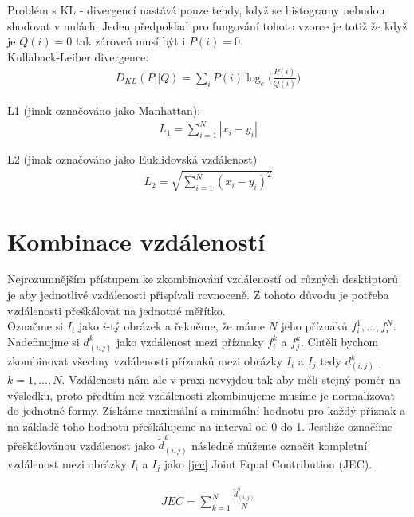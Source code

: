 \documentclass[czech,BP]{thesiskiv}
\begin{document}
Problém s KL - divergencí nastává pouze tehdy, když se histogramy nebudou shodovat v nulách. Jeden předpoklad pro fungování tohoto vzorce je totiž že když je $Q(i) = 0$ tak zároveň musí být i $P(i) = 0$. \\

Kullaback-Leiber divergence:
\begin{align}
   \label{kl}  D_{KL} (P || Q) = \sum_{i} P(i) \log_e \bigg({\frac{P(i)}{Q(i)}} \bigg) 
\end{align}

L1 (jinak označováno jako Manhattan):
\begin{align}
   \label{L1} L_1 = \sum_{i=1}^{N} |x_i - y_i|  
\end{align}

L2 (jinak označováno jako Euklidovská vzdálenost)
\begin{align}
   \label{L2} L_2 = \sqrt{\sum_{i=1}^{N} (x_i - y_i)^2}  
\end{align}
 
\section{Kombinace vzdáleností}
Nejrozumnějším přístupem ke zkombinování vzdáleností od různých desktiptorů je aby jednotlivé vzdálenosti přispívali rovnoceně. Z tohoto důvodu je potřeba vzdálenosti přeškálovat na jednotné měřítko.\\
Označme si $I_i$ jako $i$-tý obrázek a řekněme, že máme $N$ jeho příznaků $f_i^1, ..., f_i^N$. Nadefinujme si $d_{(i,j)}^k$ jako vzdálenost mezi příznaky $f_i^k$ a $f_j^k$. Chtěli bychom zkombinovat všechny vzdálenosti příznaků mezi obrázky $I_i$ a $I_j$ tedy $d_{(i,j)}^k$ , $k=1, ..., N$.  Vzdálenosti nám ale v praxi nevyjdou tak aby měli stejný poměr na výsledku, proto předtím než vzdálenosti zkombinujeme musíme je normalizovat do jednotné formy. Získáme maximální a minimální hodnotu pro každý příznak a na základě toho hodnotu přeškálujeme na interval od 0 do 1. Jestliže označíme přeškálovánou vzdálenost jako ${\tilde{d}_{(i,j)}^k}$ následně můžeme označit kompletní vzdálenost mezi obrázky $I_i$ a $I_j$ jako \eqref{jec} Joint Equal Contribution (JEC). 


\begin{align}
   \label{jec} JEC = \sum_{k=1}^N\frac{\tilde{d}_{(i,j)}^k}{N}
\end{align}
\end{document}
